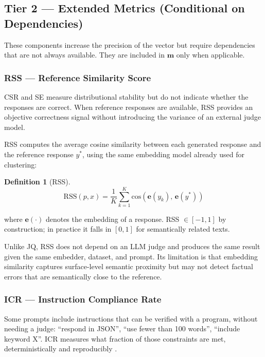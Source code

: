\documentclass[11pt,a4paper]{article}
\newtheorem{definition}{Definition}
\begin{document}
\subsection{Tier 2 — Extended Metrics (Conditional on Dependencies)}

These components increase the precision of the vector but require dependencies that are not always available. They are included in $\mathbf{m}$ only when applicable.

\subsubsection{RSS — Reference Similarity Score}

CSR and SE measure distributional stability but do not indicate whether the responses are correct. When reference responses are available, RSS provides an objective correctness signal without introducing the variance of an external judge model.

RSS computes the average cosine similarity between each generated response and the reference response $y^*$, using the same embedding model already used for clustering:

\begin{definition}[RSS]
\[
\mathrm{RSS}(p, x) = \frac{1}{K} \sum_{k=1}^{K} \mathrm{cos}\!\left(\mathbf{e}(y_k),\, \mathbf{e}(y^*)\right)
\]
\end{definition}

\noindent where $\mathbf{e}(\cdot)$ denotes the embedding of a response. RSS $\in [-1, 1]$ by construction; in practice it falls in $[0, 1]$ for semantically related texts.

Unlike JQ, RSS does not depend on an LLM judge and produces the same result given the same embedder, dataset, and prompt. Its limitation is that embedding similarity captures surface-level semantic proximity but may not detect factual errors that are semantically close to the reference.

\subsubsection{ICR — Instruction Compliance Rate}

Some prompts include instructions that can be verified with a program, without needing a judge: ``respond in JSON'', ``use fewer than 100 words'', ``include keyword X''. ICR measures what fraction of those constraints are met, deterministically and reproducibly \citep{ifeval2023}.
\end{document}
